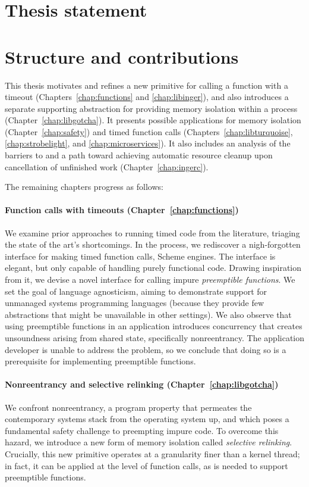 \section{Thesis statement}




\section{Structure and contributions}

This thesis motivates and refines a new primitive for calling a function with a
timeout (Chapters~\ref{chap:functions} and \ref{chap:libinger}), and also introduces
a separate supporting abstraction for providing memory isolation within a process
(Chapter~\ref{chap:libgotcha}).  It presents possible applications for memory
isolation (Chapter~\ref{chap:safety}) and timed function calls
(Chapters~\ref{chap:libturquoise}, \ref{chap:strobelight}, and
\ref{chap:microservices}).  It also includes an analysis of the barriers to and a
path toward achieving automatic resource cleanup upon cancellation of unfinished work
(Chapter~\ref{chap:ingerc}).

The remaining chapters progress as follows:

\paragraph{Function calls with timeouts (Chapter~\ref{chap:functions})}
We examine prior approaches to running timed code from the literature, triaging the
state of the art's shortcomings.  In the process, we rediscover a nigh-forgotten
interface
for making timed function calls, Scheme engines.  The interface is elegant, but only
capable of handling purely functional code.  Drawing inspiration from it, we
devise a novel interface for calling impure \textit{preemptible functions}.
We set the goal of language agnosticism, aiming to demonstrate support
for unmanaged systems programming languages (because they provide few abstractions
that might be unavailable in other settings).  We also observe that using preemptible
functions in an application introduces concurrency that creates unsoundness arising
from shared state, specifically nonreentrancy.  The application developer is unable
to address the problem, so we conclude that doing so is a prerequisite for
implementing preemptible functions.

\paragraph{Nonreentrancy and selective relinking (Chapter~\ref{chap:libgotcha})}
We confront nonreentrancy, a program property that permeates the contemporary systems
stack from the operating system up, and which poses a fundamental safety challenge to
preempting impure code.  To overcome this hazard, we introduce a new form of memory
isolation called \textit{selective relinking}.  Crucially, this new primitive
operates at a granularity finer than a kernel thread; in fact, it can be applied at
the level of function calls, as is needed to support preemptible functions.

